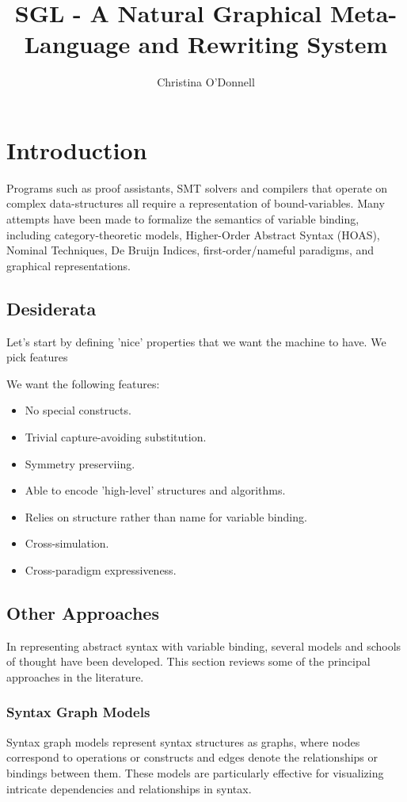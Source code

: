 \documentclass{article}
\title{SGL - A Natural Graphical Meta-Language and Rewriting System}
\author[1]{Christina O'Donnell }%
\affil[1]{Univerisity of Nottingham}
\begin{document}
\maketitle
\section{Introduction}
Programs such as proof assistants, SMT solvers and compilers that operate on
complex data-structures all require a representation of bound-variables. Many
attempts have been made to formalize the semantics of variable binding,
including category-theoretic models, Higher-Order Abstract Syntax (HOAS),
Nominal Techniques, De Bruijn Indices, first-order/nameful paradigms, and
graphical representations. 

\subsection{Desiderata}

Let's start by defining 'nice' properties that we want the machine to have. We pick features 

We want the following features:

\begin{itemize}
    \item No special constructs.
    \item Trivial capture-avoiding substitution. 
    \item Symmetry preserviing.
    \item Able to encode 'high-level' structures and algorithms.
    \item Relies on structure rather than name for variable binding.
    \item Cross-simulation.
    \item Cross-paradigm expressiveness.
\end{itemize}

\subsection{Other Approaches}
In representing abstract syntax with variable binding, several models and
schools of thought have been developed. This section reviews some of the
principal approaches in the literature.

\subsubsection{Syntax Graph Models}
Syntax graph models represent syntax structures as graphs, where nodes
correspond to operations or constructs and edges denote the relationships or
bindings between them. These models are particularly effective for visualizing
intricate dependencies and relationships in syntax.
\end{document}
